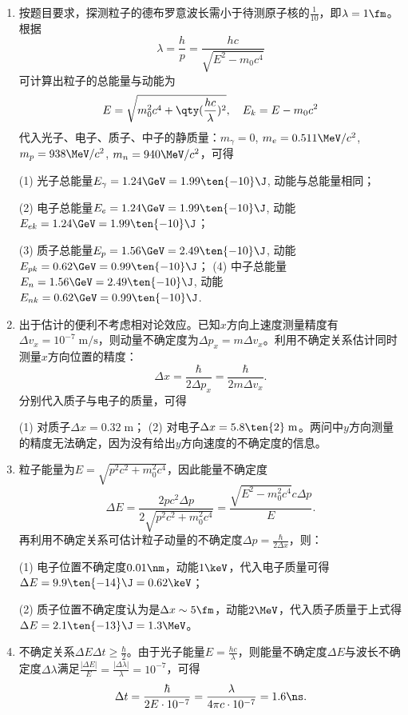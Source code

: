 \begin{enumerate}[label=2.\arabic*]

\item
按题目要求，探测粒子的德布罗意波长需小于待测原子核的$\frac{1}{10}$，即$\lambda = 1\fm$。根据
\[\lambda = \frac{h}{p} = \frac{hc}{\sqrt{E^2-m_0c^4}}\]
可计算出粒子的总能量与动能为
\[E = \sqrt{m_0^2c^4+\qty(\frac{hc}{\lambda})^2},\quad E_k = E-m_0c^2\]
代入光子、电子、质子、中子的静质量：$m_\gamma=0$, $m_e=0.511\MeV/c^2$, $m_p=938\MeV/c^2$, $m_n=940\MeV/c^2$，可得

(1) 光子总能量$E_\gamma=1.24\GeV=1.99\ten{-10}\J$, 动能与总能量相同；

(2) 电子总能量$E_e = 1.24\GeV = 1.99\ten{-10}\J$, 动能$E_{ek} = 1.24\GeV = 1.99\ten{-10}\J$；

(3) 质子总能量$E_p = 1.56\GeV = 2.49\ten{-10}\J$, 动能$E_{pk} = 0.62\GeV = 0.99\ten{-10}\J$；
(4) 中子总能量$E_n = 1.56\GeV = 2.49\ten{-10}\J$, 动能$E_{nk} = 0.62\GeV = 0.99\ten{-10}\J$.

\item
出于估计的便利不考虑相对论效应。已知$x$方向上速度测量精度有$\Delta v_x=10^{-7}\;\mathrm{m/s}$，则动量不确定度为$\Delta p_x=m\Delta v_x$。利用不确定关系估计同时测量$x$方向位置的精度：
\[\Delta x = \frac{\hbar}{2\Delta p_x} = \frac{\hbar}{2m\Delta v_x}.\]
分别代入质子与电子的质量，可得

(1) 对质子$\Delta x=0.32\;\mathrm{m}$； (2) 对电子$\Delta x=5.8\ten{2}\;\mathrm{m}$。两问中$y$方向测量的精度无法确定，因为没有给出$y$方向速度的不确定度的信息。

\item
粒子能量为$E=\sqrt{p^2c^2+m_0^2c^4}$，因此能量不确定度
\[\Delta E = \frac{2pc^2\Delta p}{2\sqrt{p^2c^2+m_0^2c^4}} = \frac{\sqrt{E^2-m_0^2c^4} c\Delta p}{E}.\]
再利用不确定关系可估计粒子动量的不确定度$\Delta p = \frac{\hbar}{2\Delta x}$，则：

(1) 电子位置不确定度$0.01\nm$，动能$1\keV$，代入电子质量可得$\Delta E =9.9\ten{-14}\J = 0.62\keV$；

(2) 质子位置不确定度认为是$\Delta x\sim 5\fm$，动能$2\MeV$，代入质子质量于上式得$\Delta E=2.1\ten{-13}\J=1.3\MeV$。

\item
不确定关系$\Delta E\Delta t\geq \frac{\hbar}{2}$。由于光子能量$E=\frac{hc}{\lambda}$，则能量不确定度$\Delta E$与波长不确定度$\Delta \lambda$满足$\frac{|\Delta E|}{E} =\frac{|\Delta\lambda|}{\lambda}=10^{-7} $，可得
\[\Delta t = \frac{\hbar}{2E\cdot 10^{-7}} = \frac{\lambda}{4\pi c\cdot10^{-7}}=1.6\ns.\]


\end{enumerate}
